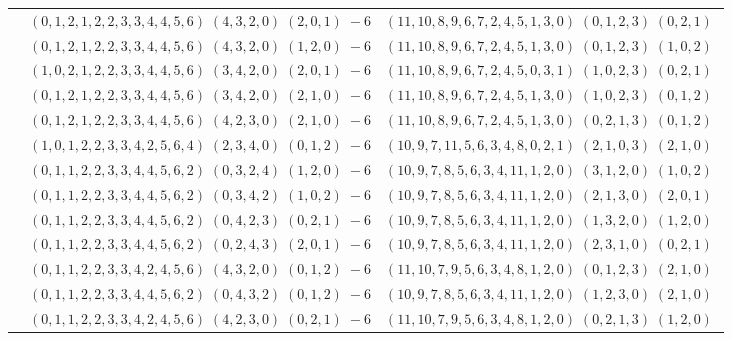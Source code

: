 \documentclass[11pt]{article}
\begin{document}
\begin{longtable}[l]{|c|c|c|}
 \cline{2-3} 
 & $(0 ,1 ,2 ,1 ,2 ,2 ,3 ,3 ,4 ,4 ,5 ,6) \;(4 ,3 ,2 ,0) \;(2 ,0 ,1) \;-6$ & $(11 ,10 ,8 ,9 ,6 ,7 ,2 ,4 ,5 ,1 ,3 ,0) \;(0 ,1 ,2 ,3) \;(0 ,2 ,1) \;$\\ 
 \cline{2-3} 
 & $(0 ,1 ,2 ,1 ,2 ,2 ,3 ,3 ,4 ,4 ,5 ,6) \;(4 ,3 ,2 ,0) \;(1 ,2 ,0) \;-6$ & $(11 ,10 ,8 ,9 ,6 ,7 ,2 ,4 ,5 ,1 ,3 ,0) \;(0 ,1 ,2 ,3) \;(1 ,0 ,2) \;$\\ 
 \cline{2-3} 
 & $(1 ,0 ,2 ,1 ,2 ,2 ,3 ,3 ,4 ,4 ,5 ,6) \;(3 ,4 ,2 ,0) \;(2 ,0 ,1) \;-6$ & $(11 ,10 ,8 ,9 ,6 ,7 ,2 ,4 ,5 ,0 ,3 ,1) \;(1 ,0 ,2 ,3) \;(0 ,2 ,1) \;$\\ 
 \cline{2-3} 
 & $(0 ,1 ,2 ,1 ,2 ,2 ,3 ,3 ,4 ,4 ,5 ,6) \;(3 ,4 ,2 ,0) \;(2 ,1 ,0) \;-6$ & $(11 ,10 ,8 ,9 ,6 ,7 ,2 ,4 ,5 ,1 ,3 ,0) \;(1 ,0 ,2 ,3) \;(0 ,1 ,2) \;$\\ 
 \cline{2-3} 
 & $(0 ,1 ,2 ,1 ,2 ,2 ,3 ,3 ,4 ,4 ,5 ,6) \;(4 ,2 ,3 ,0) \;(2 ,1 ,0) \;-6$ & $(11 ,10 ,8 ,9 ,6 ,7 ,2 ,4 ,5 ,1 ,3 ,0) \;(0 ,2 ,1 ,3) \;(0 ,1 ,2) \;$\\ 
 \cline{2-3} 
 & $(1 ,0 ,1 ,2 ,2 ,3 ,3 ,4 ,2 ,5 ,6 ,4) \;(2 ,3 ,4 ,0) \;(0 ,1 ,2) \;-6$ & $(10 ,9 ,7 ,11 ,5 ,6 ,3 ,4 ,8 ,0 ,2 ,1) \;(2 ,1 ,0 ,3) \;(2 ,1 ,0) \;$\\ 
 \cline{2-3} 
 & $(0 ,1 ,1 ,2 ,2 ,3 ,3 ,4 ,4 ,5 ,6 ,2) \;(0 ,3 ,2 ,4) \;(1 ,2 ,0) \;-6$ & $(10 ,9 ,7 ,8 ,5 ,6 ,3 ,4 ,11 ,1 ,2 ,0) \;(3 ,1 ,2 ,0) \;(1 ,0 ,2) \;$\\ 
 \cline{2-3} 
 & $(0 ,1 ,1 ,2 ,2 ,3 ,3 ,4 ,4 ,5 ,6 ,2) \;(0 ,3 ,4 ,2) \;(1 ,0 ,2) \;-6$ & $(10 ,9 ,7 ,8 ,5 ,6 ,3 ,4 ,11 ,1 ,2 ,0) \;(2 ,1 ,3 ,0) \;(2 ,0 ,1) \;$\\ 
 \cline{2-3} 
 & $(0 ,1 ,1 ,2 ,2 ,3 ,3 ,4 ,4 ,5 ,6 ,2) \;(0 ,4 ,2 ,3) \;(0 ,2 ,1) \;-6$ & $(10 ,9 ,7 ,8 ,5 ,6 ,3 ,4 ,11 ,1 ,2 ,0) \;(1 ,3 ,2 ,0) \;(1 ,2 ,0) \;$\\ 
 \cline{2-3} 
 & $(0 ,1 ,1 ,2 ,2 ,3 ,3 ,4 ,4 ,5 ,6 ,2) \;(0 ,2 ,4 ,3) \;(2 ,0 ,1) \;-6$ & $(10 ,9 ,7 ,8 ,5 ,6 ,3 ,4 ,11 ,1 ,2 ,0) \;(2 ,3 ,1 ,0) \;(0 ,2 ,1) \;$\\ 
 \cline{2-3} 
 & $(0 ,1 ,1 ,2 ,2 ,3 ,3 ,4 ,2 ,4 ,5 ,6) \;(4 ,3 ,2 ,0) \;(0 ,1 ,2) \;-6$ & $(11 ,10 ,7 ,9 ,5 ,6 ,3 ,4 ,8 ,1 ,2 ,0) \;(0 ,1 ,2 ,3) \;(2 ,1 ,0) \;$\\ 
 \cline{2-3} 
 & $(0 ,1 ,1 ,2 ,2 ,3 ,3 ,4 ,4 ,5 ,6 ,2) \;(0 ,4 ,3 ,2) \;(0 ,1 ,2) \;-6$ & $(10 ,9 ,7 ,8 ,5 ,6 ,3 ,4 ,11 ,1 ,2 ,0) \;(1 ,2 ,3 ,0) \;(2 ,1 ,0) \;$\\ 
 \cline{2-3} 
 & $(0 ,1 ,1 ,2 ,2 ,3 ,3 ,4 ,2 ,4 ,5 ,6) \;(4 ,2 ,3 ,0) \;(0 ,2 ,1) \;-6$ & $(11 ,10 ,7 ,9 ,5 ,6 ,3 ,4 ,8 ,1 ,2 ,0) \;(0 ,2 ,1 ,3) \;(1 ,2 ,0) \;$\\ 

\end{longtable}
\end{document}
